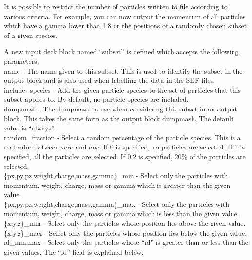 It is possible to restrict the number of particles written to file
according to various criteria. For example, you can now output the
momentum of all particles which have a gamma lower than 1.8 or the
positions of a randomly chosen subset of a given species.

A new input deck block named ``subset'' is defined which accepts the following
parameters:\\

{\emphtext name} - The name given to this subset. This is used to identify the
  subset in the output block and is also used when labelling the data in the
  SDF files.\\

{\emphtext include\_species} - Add the given particle species to the set of
  particles that this subset applies to. By default, no particle species
  are included.\\

{\emphtext dumpmask} - The dumpmask to use when considering this subset in
  an output block. This takes the same form as the output block dumpmask.
  The default value is ``always''.\\

{\emphtext random\_fraction} - Select a random percentage of the particle
  species. This is a real value between zero and one. If 0 is specified,
  no particles are selected. If 1 is specified, all the particles are
  selected. If 0.2 is specified, 20\% of the particles are selected.\\

{\emphtext \{px,py,pz,weight,charge,mass,gamma\}\_min} - Select only the
  particles with momentum, weight, charge, mass or gamma which is greater
  than the given value.\\

{\emphtext \{px,py,pz,weight,charge,mass,gamma\}\_max} - Select only the
  particles with momentum, weight, charge, mass or gamma which is less
  than the given value.\\

{\emphtext \{x,y,z\}\_min} - Select only the particles whose position lies
  above the given value.\\

{\emphtext \{x,y,z\}\_max} - Select only the particles whose position lies
  below the given value.\\

{\emphtext id\_{min,max}} - Select only the particles whose ``id'' is greater
  than or less than the given values. The ``id'' field is explained below.\\

